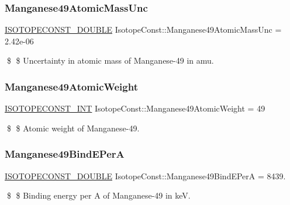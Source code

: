 \subsubsection{\texorpdfstring{Manganese49\+Atomic\+Mass\+Unc}{Manganese49AtomicMassUnc}}
{\footnotesize\ttfamily \mbox{\hyperlink{group___isotope_const-_macros_ga8f45a7272ce02c0b4c65c44636ed719a}{I\+S\+O\+T\+O\+P\+E\+C\+O\+N\+S\+T\+\_\+\+D\+O\+U\+B\+LE}} Isotope\+Const\+::\+Manganese49\+Atomic\+Mass\+Unc = 2.\+42e-\/06}

\$ \$ Uncertainty in atomic mass of Manganese-\/49 in amu. \mbox{\label{group___isotope_const-_manganese-_mn49_gad014523ac91f0cd53a116fd07454a696}} 
\subsubsection{\texorpdfstring{Manganese49\+Atomic\+Weight}{Manganese49AtomicWeight}}
{\footnotesize\ttfamily \mbox{\hyperlink{group___isotope_const-_macros_ga5f18360b3e99483a35c32d789e62621c}{I\+S\+O\+T\+O\+P\+E\+C\+O\+N\+S\+T\+\_\+\+I\+NT}} Isotope\+Const\+::\+Manganese49\+Atomic\+Weight = 49}

\$ \$ Atomic weight of Manganese-\/49. \mbox{\label{group___isotope_const-_manganese-_mn49_ga0446b83875eff684747414cc15b5f6ed}} 
\subsubsection{\texorpdfstring{Manganese49\+Bind\+E\+PerA}{Manganese49BindEPerA}}
{\footnotesize\ttfamily \mbox{\hyperlink{group___isotope_const-_macros_ga8f45a7272ce02c0b4c65c44636ed719a}{I\+S\+O\+T\+O\+P\+E\+C\+O\+N\+S\+T\+\_\+\+D\+O\+U\+B\+LE}} Isotope\+Const\+::\+Manganese49\+Bind\+E\+PerA = 8439.}

\$ \$ Binding energy per A of Manganese-\/49 in keV. \mbox{\label{group___isotope_const-_manganese-_mn49_gad767d18f999abf2f1a376d4fd558a328}} 
